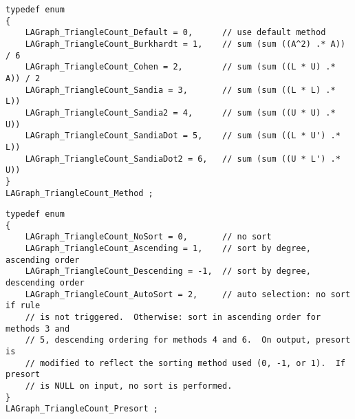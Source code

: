 \begin{verbatim}
typedef enum
{
    LAGraph_TriangleCount_Default = 0,      // use default method
    LAGraph_TriangleCount_Burkhardt = 1,    // sum (sum ((A^2) .* A)) / 6
    LAGraph_TriangleCount_Cohen = 2,        // sum (sum ((L * U) .* A)) / 2
    LAGraph_TriangleCount_Sandia = 3,       // sum (sum ((L * L) .* L))
    LAGraph_TriangleCount_Sandia2 = 4,      // sum (sum ((U * U) .* U))
    LAGraph_TriangleCount_SandiaDot = 5,    // sum (sum ((L * U') .* L))
    LAGraph_TriangleCount_SandiaDot2 = 6,   // sum (sum ((U * L') .* U))
}
LAGraph_TriangleCount_Method ;
\end{verbatim}




\begin{verbatim}
typedef enum
{
    LAGraph_TriangleCount_NoSort = 0,       // no sort
    LAGraph_TriangleCount_Ascending = 1,    // sort by degree, ascending order
    LAGraph_TriangleCount_Descending = -1,  // sort by degree, descending order
    LAGraph_TriangleCount_AutoSort = 2,     // auto selection: no sort if rule
    // is not triggered.  Otherwise: sort in ascending order for methods 3 and
    // 5, descending ordering for methods 4 and 6.  On output, presort is
    // modified to reflect the sorting method used (0, -1, or 1).  If presort
    // is NULL on input, no sort is performed.
}
LAGraph_TriangleCount_Presort ;
\end{verbatim}




